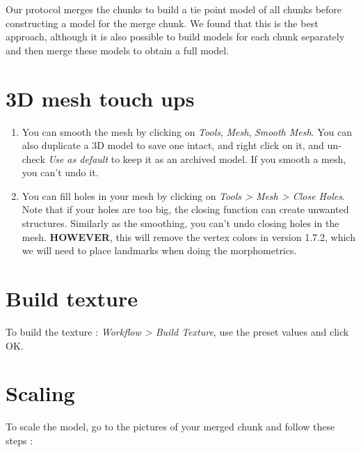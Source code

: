 \documentclass[
]{book}
\theoremstyle{definition}
\theoremstyle{definition}
\theoremstyle{definition}
\theoremstyle{definition}
\theoremstyle{remark}
\begin{document}
Our protocol merges the chunks to build a tie point model of all chunks
before constructing a model for the merge chunk. We found that this is
the best approach, although it is also possible to build models for each
chunk separately and then merge these models to obtain a full model.

\hypertarget{d-mesh-touch-ups}{%
\section{3D mesh touch ups}\label{d-mesh-touch-ups}}

\begin{enumerate}
\def\labelenumi{\arabic{enumi}.}
\item
  You can smooth the mesh by clicking on \emph{Tools}, \emph{Mesh}, \emph{Smooth
  Mesh}. You can also duplicate a 3D model to save one intact, and
  right click on it, and un-check \emph{Use as default} to keep it as an
  archived model. If you smooth a mesh, you can't undo it.
\item
  You can fill holes in your mesh by clicking on \emph{Tools \textgreater{} Mesh \textgreater{}
  Close Holes}. Note that if your holes are too big, the closing
  function can create unwanted structures. Similarly as the smoothing,
  you can't undo closing holes in the mesh. \textbf{HOWEVER}, this will
  remove the vertex colors in version 1.7.2, which we will need to
  place landmarks when doing the morphometrics.
\end{enumerate}

\hypertarget{build-texture}{%
\section{Build texture}\label{build-texture}}

To build the texture : \emph{Workflow \textgreater{} Build Texture}, use the preset
values and click OK.

\hypertarget{scaling}{%
\section{Scaling}\label{scaling}}

To scale the model, go to the pictures of your merged chunk and follow
these steps :
\end{document}
